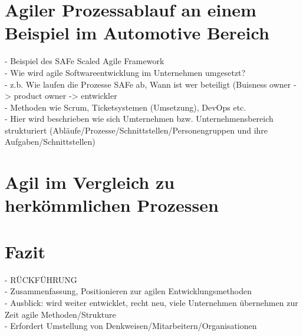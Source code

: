 \section{Agiler Prozessablauf an einem Beispiel im Automotive Bereich}
- Beispiel des SAFe Scaled Agile Framework\\ 
- Wie wird agile Softwareentwicklung im Unternehmen umgesetzt? \\
- z.b. Wie laufen die Prozesse SAFe ab, Wann ist wer beteiligt (Buisness owner -> product owner -> entwickler\\
- Methoden wie Scrum, Ticketsystemen (Umsetzung), DevOps etc. \\ 
- Hier wird beschrieben wie sich Umternehmen bzw. Unternehmensbereich strukturiert (Abläufe/Prozesse/Schnittstellen/Personengruppen und ihre Aufgaben/Schnittstellen) \\ 
 
\section{Agil im Vergleich zu herkömmlichen Prozessen}\label{vergleich}



\section{Fazit}
- RÜCKFÜHRUNG\\
- Zusammenfassung, Positionieren zur agilen Entwicklungsmethoden \\
- Ausblick: wird weiter entwicklet, recht neu, viele Unternehmen übernehmen zur Zeit agile Methoden/Strukture \\
- Erfordert Umstellung von Denkweisen/Mitarbeitern/Organisationen\\

